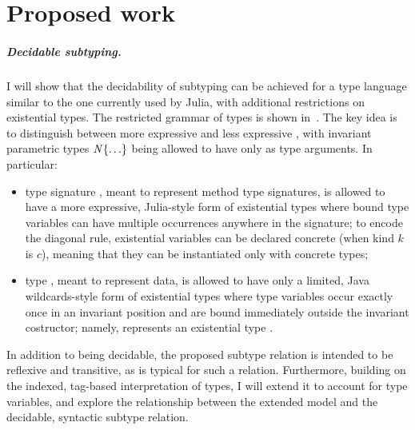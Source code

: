 \chapter{Proposed work}\label{chap:6}

\paragraph*{Decidable subtyping.}
I will show that
the decidability of subtyping can be achieved
for a type language similar to the one currently used by Julia,
with additional restrictions on existential types.
The restricted grammar of types is shown
in~.
The key idea is to distinguish between more expressive \tysig and
less expressive \ty, with invariant parametric types $\mathit{N}\{\ldots\}$
being allowed to have only \ty as type arguments. In particular:
\begin{itemize}
  \item type signature \tysig, meant to represent method type signatures, is
  allowed to have a more expressive, Julia-style form of existential types where
  bound type variables can have multiple occurrences anywhere in the signature;
  to encode the diagonal rule, existential variables can be declared concrete
  (when kind $k$ is $c$), meaning that they can be instantiated only with
  concrete types;
  \item type \ty, meant to represent data, is allowed to have only a limited,
  Java wildcards-style form of existential types where type variables
  occur exactly once in an invariant position and are bound immediately outside
  the invariant costructor; namely,  represents
  an existential type .
\end{itemize}
In addition to being decidable, the proposed subtype relation
is intended to be reflexive and transitive,
as is typical for such a relation. Furthermore,
building on the indexed, tag-based interpretation of types, I will extend
it to account for type variables, and explore the relationship between
the extended model and the decidable, syntactic subtype relation.


